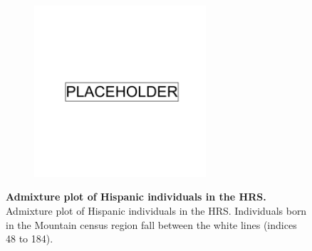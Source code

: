 \newpage

\begin{figure}[ht]
    \centering
    \begin{subfigure}{\textwidth}
    \includegraphics[width=0.7\textwidth]{placeholder.png}
    \end{subfigure}
    \caption[Admixture plot of Hispanic individuals in the HRS]{\textbf{Admixture plot of Hispanic individuals in the HRS.} Admixture plot of Hispanic individuals in the HRS. Individuals born in the Mountain census region fall between the white lines (indices 48 to 184).}
    \label{fig:supp_hrs_hisp_admix}
\end{figure}

\clearpage

